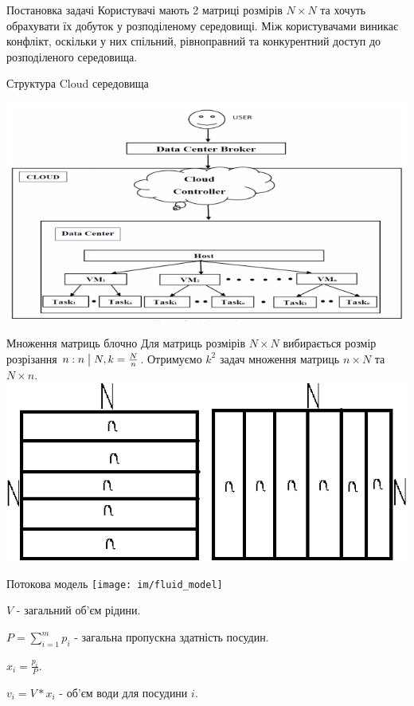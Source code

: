 \begin{frame}{Постановка задачі}
	\manimate
	Користувачі мають 2 матриці розмірів $N \times N$ та хочуть обрахувати їх добуток у розподіленому середовищі.
	Між користувачами виникає конфлікт, оскільки у них спільний, рівноправний та конкурентний доступ до розподіленого середовища. 
\end{frame}

\begin{frame}{Структура Cloud середовища}
	\manimate
	
	\includegraphics[width=1.0\linewidth]{im/cloud_representation}
\end{frame}

\begin{frame}{Множення матриць блочно}
	\manimate
	Для матриць розмірів $N \times N$ вибирається розмір розрізання $n: n \bigm| N, k = \frac{N}{n}$. Отримуємо $k^2$ задач множення матриць $n \times N$ та $N \times n$.
	\includegraphics[width=0.8\linewidth]{im/matrixmatrix}
\end{frame}

\begin{frame}{Потокова модель}
	\manimate
	\centering
	\texttt{[image: im/fluid\_model]}
	
	$V$ - загальний об'єм рідини.

	$P = \sum_{i=1}^{m} p_i$ - загальна пропускна здатність посудин.
	
	$x_i = \frac{p_i}{P}$.
	
	$v_i = V * x_i$ - об'єм води для посудини $i$.

\end{frame}

